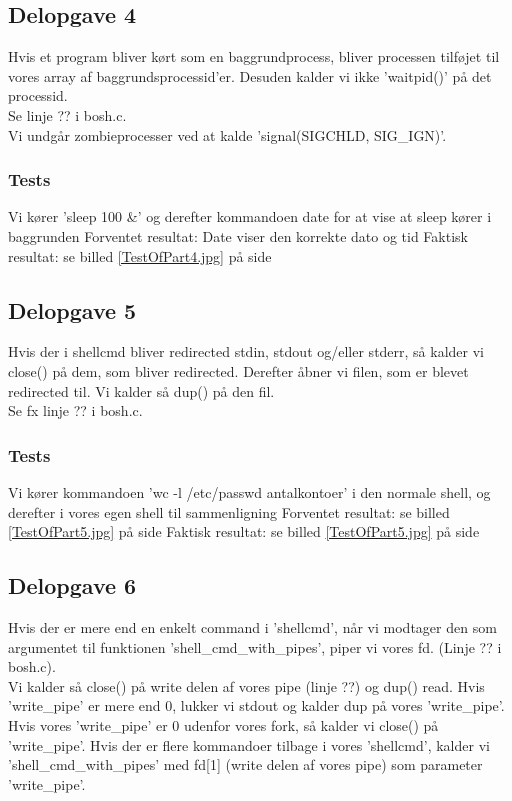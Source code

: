 \subsection{Delopgave 4}
Hvis et program bliver kørt som en baggrundprocess, bliver processen tilføjet til vores array af baggrundsprocessid'er. Desuden kalder vi ikke 'waitpid()' på det processid. 
\\Se linje ?? i bosh.c.
\\Vi undgår zombieprocesser ved at kalde 'signal(SIGCHLD, SIG\_IGN)'.
\subsubsection{Tests}
Vi kører 'sleep 100 \&' og derefter kommandoen date for at vise at sleep kører i baggrunden
Forventet resultat: Date viser den korrekte dato og tid
Faktisk resultat: se billed \ref{TestOfPart4.jpg} på side \pageref{Test4} 

\subsection{Delopgave 5}
Hvis der i shellcmd bliver redirected stdin, stdout og/eller stderr, så kalder vi close() på dem, som bliver redirected. Derefter åbner vi filen, som er blevet redirected til. Vi kalder så dup() på den fil.
\\Se fx linje ?? i bosh.c.
\subsubsection{Tests}
Vi kører kommandoen 'wc -l \lhd /etc/passwd \rhd antalkontoer' i den normale shell, og derefter i vores egen shell til sammenligning
Forventet resultat: se billed \ref{TestOfPart5.jpg} på side \pageref{Test5}
Faktisk resultat: se billed \ref{TestOfPart5.jpg} på side \pageref{Test5} 

\subsection{Delopgave 6}
Hvis der er mere end en enkelt command i 'shellcmd', når vi modtager den som argumentet til funktionen 'shell\_cmd\_with\_pipes', piper vi vores fd. (Linje ?? i bosh.c).
\\Vi kalder så close() på write delen af vores pipe (linje ??) og dup() read. Hvis 'write\_pipe' er mere end 0, lukker vi stdout og kalder dup på vores 'write\_pipe'.
\\Hvis vores 'write\_pipe' er 0 udenfor vores fork, så kalder vi close() på 'write\_pipe'. Hvis der er flere kommandoer tilbage i vores 'shellcmd', kalder vi 'shell\_cmd\_with\_pipes' med fd[1] (write delen af vores pipe) som parameter 'write\_pipe'.
